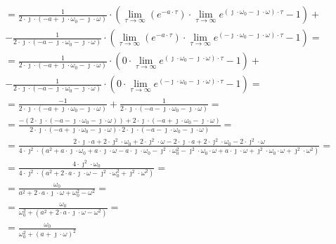 \begin{task}
\begin{align*}
&=\frac{1}{2 \cdot \jmath \cdot (-a + \jmath \cdot \omega_{0} -\jmath \cdot \omega)} \cdot \left(\lim_{\tau \rightarrow \infty }
( e^{-a \cdot \tau})\cdot \lim_{\tau \rightarrow \infty } e^{(\jmath \cdot \omega_{0} -\jmath \cdot \omega) \cdot \tau}-1\right)+\\
&-\frac{1}{2 \cdot \jmath \cdot (-a - \jmath \cdot \omega_{0} -\jmath \cdot \omega)} \cdot \left(\lim_{\tau \rightarrow \infty }
( e^{-a \cdot \tau})\cdot \lim_{\tau \rightarrow \infty } e^{(-\jmath \cdot \omega_{0} -\jmath \cdot \omega) \cdot \tau}-1\right)=\\
&=\frac{1}{2 \cdot \jmath \cdot (-a + \jmath \cdot \omega_{0} -\jmath \cdot \omega)} \cdot \left(0 \cdot \lim_{\tau \rightarrow \infty } e^{(\jmath \cdot \omega_{0} -\jmath \cdot \omega) \cdot \tau}-1\right)+\\
&-\frac{1}{2 \cdot \jmath \cdot (-a - \jmath \cdot \omega_{0} -\jmath \cdot \omega)} \cdot \left(0 \cdot \lim_{\tau \rightarrow \infty } e^{(-\jmath \cdot \omega_{0} -\jmath \cdot \omega) \cdot \tau}-1\right)=\\
&=\frac{-1}{2 \cdot \jmath \cdot (-a + \jmath \cdot \omega_{0} -\jmath \cdot \omega)}+\frac{1}{2 \cdot \jmath \cdot (-a - \jmath \cdot \omega_{0} -\jmath \cdot \omega)}=\\
&=\frac{-(2 \cdot \jmath \cdot (-a - \jmath \cdot \omega_{0} -\jmath \cdot \omega))+2 \cdot \jmath \cdot (-a + \jmath \cdot \omega_{0} -\jmath \cdot \omega)}{2 \cdot \jmath \cdot (-a + \jmath \cdot \omega_{0} -\jmath \cdot \omega) \cdot 2 \cdot \jmath \cdot (-a - \jmath \cdot \omega_{0} -\jmath \cdot \omega)}=\\
&=\frac{2 \cdot \jmath \cdot a + 2 \cdot \jmath^{2} \cdot \omega_{0} + 2 \cdot \jmath^{2} \cdot \omega - 2 \cdot \jmath \cdot a + 2 \cdot \jmath^{2} \cdot \omega_{0} - 2 \cdot \jmath^{2} \cdot \omega}
{4 \cdot \jmath^{2} \cdot 
	(a^{2}+ a \cdot \jmath \cdot \omega_{0}+ a \cdot \jmath \cdot \omega
-a \cdot \jmath \cdot \omega_{0}- \jmath^{2} \cdot \omega_{0}^{2}- \jmath^{2} \cdot \omega_{0} \cdot \omega
+a \cdot \jmath \cdot \omega+ \jmath^{2} \cdot \omega_{0} \cdot \omega + \jmath^{2} \cdot \omega^{2})}=\\
&=\frac{4 \cdot \jmath^{2} \cdot \omega_{0}}
{4 \cdot \jmath^{2} \cdot (a^{2} + 2 \cdot a \cdot \jmath \cdot \omega - \jmath^{2} \cdot \omega_{0}^{2} + \jmath^{2} \cdot \omega^{2})}=\\
&=\frac{\omega_{0}}{a^{2} + 2 \cdot a \cdot \jmath \cdot \omega + \omega_{0}^{2} - \omega^{2}}=\\
&=\frac{\omega_{0}}{\omega_{0}^{2} + (a^{2} + 2 \cdot a \cdot \jmath \cdot \omega - \omega^{2})}=\\
&=\frac{\omega_{0}}{\omega_{0}^{2} + (a + \jmath \cdot \omega)^{2}}
\end{align*}


\end{task}
